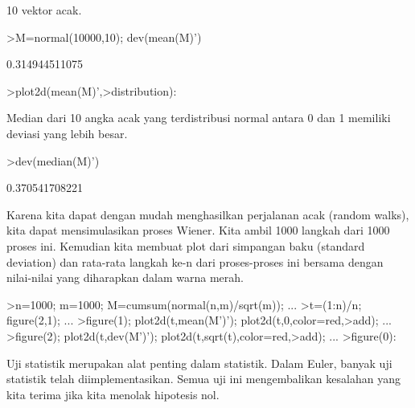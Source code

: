 \documentclass[a4paper,10pt]{article}
\begin{document}
\begin{eulernotebook}
\begin{eulercomment}
10 vektor acak.
\end{eulercomment}
\begin{eulerprompt}
>M=normal(10000,10); dev(mean(M)')
\end{eulerprompt}
\begin{euleroutput}
  0.314944511075
\end{euleroutput}
\begin{eulerprompt}
>plot2d(mean(M)',>distribution):
\end{eulerprompt}
\begin{eulercomment}
Median dari 10 angka acak yang terdistribusi normal antara 0 dan 1
memiliki deviasi yang lebih besar.
\end{eulercomment}
\begin{eulerprompt}
>dev(median(M)')
\end{eulerprompt}
\begin{euleroutput}
  0.370541708221
\end{euleroutput}
\begin{eulercomment}
Karena kita dapat dengan mudah menghasilkan perjalanan acak (random
walks), kita dapat mensimulasikan proses Wiener. Kita ambil 1000
langkah dari 1000 proses ini. Kemudian kita membuat plot dari
simpangan baku (standard deviation) dan rata-rata langkah ke-n dari
proses-proses ini bersama dengan nilai-nilai yang diharapkan dalam
warna merah.
\end{eulercomment}
\begin{eulerprompt}
>n=1000; m=1000; M=cumsum(normal(n,m)/sqrt(m)); ...
>t=(1:n)/n; figure(2,1); ...
>figure(1); plot2d(t,mean(M')'); plot2d(t,0,color=red,>add); ...
>figure(2); plot2d(t,dev(M')'); plot2d(t,sqrt(t),color=red,>add); ...
>figure(0):
\end{eulerprompt}
\begin{eulercomment}
Uji statistik merupakan alat penting dalam statistik. Dalam Euler,
banyak uji statistik telah diimplementasikan. Semua uji ini
mengembalikan kesalahan yang kita terima jika kita menolak hipotesis
nol.


\end{eulercomment}
\end{eulernotebook}
\end{document}
